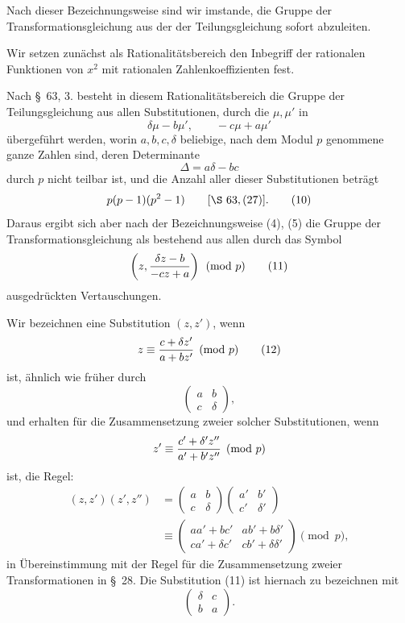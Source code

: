 \documentclass[11pt]{article}
\begin{document}
Nach dieser Bezeichnungsweise sind wir imstande, die Gruppe der Transformationsgleichung aus der der Teilungsgleichung sofort abzuleiten.

Wir setzen zunächst als Rationalitätsbereich den Inbegriff der rationalen Funktionen von $x^2$ mit rationalen Zahlenkoeffizienten fest.

Nach \S~63, 3. besteht in diesem Rationalitätsbereich die Gruppe der Teilungsgleichung aus allen Substitutionen, durch die $\mu,\mu'$ in
\[
 \delta\mu-b\mu',
 \qquad
 -c\mu+a\mu'
\]
übergeführt werden, worin $a,b,c,\delta$ beliebige, nach dem Modul $p$ genommene ganze Zahlen sind, deren Determinante
\begin{equation}
 \Delta=a\delta-bc
\tag{9}
\end{equation}
durch $p$ nicht teilbar ist, und die Anzahl aller dieser Substitutionen beträgt
\begin{equation}
 p(p-1)(p^2-1) \qquad [\S~63,(27)].
\tag{10}
\end{equation}
Daraus ergibt sich aber nach der Bezeichnungsweise (4), (5) die Gruppe der Transformationsgleichung als bestehend aus allen durch das Symbol
\begin{equation}
 \left(z,{\delta z-b\over -cz+a}\right)\pmod p
\tag{11}
\end{equation}
ausgedrückten Vertauschungen.

Wir bezeichnen eine Substitution $(z,z')$, wenn
\begin{equation}
 z\equiv {c+\delta z'\over a+bz'}\pmod p
\tag{12}
\end{equation}
ist, ähnlich wie früher durch
\begin{equation}
\begin{pmatrix}a&b\\ c&\delta\end{pmatrix},
\tag{13}
\end{equation}
und erhalten für die Zusammensetzung zweier solcher Substitutionen, wenn
\[
 z'\equiv {c'+\delta' z''\over a'+b'z''}\pmod p
\]
ist, die Regel:
\begin{equation}
\begin{aligned}
 (z,z')(z',z'')&=\begin{pmatrix}a&b\\ c&\delta\end{pmatrix}\begin{pmatrix}a'&b'\\ c'&\delta'\end{pmatrix}\\
&\equiv\begin{pmatrix}aa'+bc'&ab'+b\delta'\\ ca'+\delta c'&cb'+\delta\delta'\end{pmatrix}\pmod p,
\end{aligned}
\tag{14}
\end{equation}
in Übereinstimmung mit der Regel für die Zusammensetzung zweier Transformationen in \S~28. Die Substitution (11) ist hiernach zu bezeichnen mit
\[
\begin{pmatrix}\delta&c\\ b&a\end{pmatrix}.
\]
\end{document}

